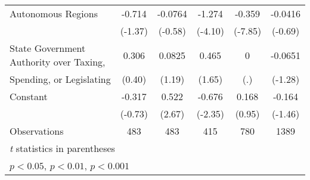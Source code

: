 \begin{table}[htbp]
\begin{tabular}{l*{5}{c}}
\addlinespace
Autonomous Regions                      &   -0.714         &  -0.0764         &   -1.274\sym{***}&   -0.359\sym{***}&  -0.0416         \\
                                        &  (-1.37)         &  (-0.58)         &  (-4.10)         &  (-7.85)         &  (-0.69)         \\
\addlinespace
State Government Authority over Taxing, &    0.306         &   0.0825         &    0.465         &        0         &  -0.0651         \\
Spending, or Legislating                &   (0.40)         &   (1.19)         &   (1.65)         &      (.)         &  (-1.28)         \\
\addlinespace
Constant                                &   -0.317         &    0.522\sym{**} &   -0.676\sym{*}  &    0.168         &   -0.164         \\
                                        &  (-0.73)         &   (2.67)         &  (-2.35)         &   (0.95)         &  (-1.46)         \\
\midrule
Observations                            &      483         &      483         &      415         &      780         &     1389         \\
\bottomrule
\multicolumn{6}{l}{\footnotesize \textit{t} statistics in parentheses}\\
\multicolumn{6}{l}{\footnotesize \sym{*} \(p<0.05\), \sym{**} \(p<0.01\), \sym{***} \(p<0.001\)}\\
\end{tabular}
\end{table}
